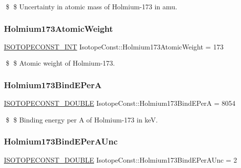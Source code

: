 \$ \$ Uncertainty in atomic mass of Holmium-\/173 in amu. \mbox{\label{group___isotope_const-_holmium-_ho173_ga787717fe8e2a869a5706501192868481}} 
\subsubsection{\texorpdfstring{Holmium173\+Atomic\+Weight}{Holmium173AtomicWeight}}
{\footnotesize\ttfamily \mbox{\hyperlink{group___isotope_const-_macros_ga5f18360b3e99483a35c32d789e62621c}{I\+S\+O\+T\+O\+P\+E\+C\+O\+N\+S\+T\+\_\+\+I\+NT}} Isotope\+Const\+::\+Holmium173\+Atomic\+Weight = 173}

\$ \$ Atomic weight of Holmium-\/173. \mbox{\label{group___isotope_const-_holmium-_ho173_gac6420527bf4813cfd605c01fb83e79b8}} 
\subsubsection{\texorpdfstring{Holmium173\+Bind\+E\+PerA}{Holmium173BindEPerA}}
{\footnotesize\ttfamily \mbox{\hyperlink{group___isotope_const-_macros_ga8f45a7272ce02c0b4c65c44636ed719a}{I\+S\+O\+T\+O\+P\+E\+C\+O\+N\+S\+T\+\_\+\+D\+O\+U\+B\+LE}} Isotope\+Const\+::\+Holmium173\+Bind\+E\+PerA = 8054}

\$ \$ Binding energy per A of Holmium-\/173 in keV. \mbox{\label{group___isotope_const-_holmium-_ho173_gaa86fe779584d4318f7cdbbf8e7700664}} 
\subsubsection{\texorpdfstring{Holmium173\+Bind\+E\+Per\+A\+Unc}{Holmium173BindEPerAUnc}}
{\footnotesize\ttfamily \mbox{\hyperlink{group___isotope_const-_macros_ga8f45a7272ce02c0b4c65c44636ed719a}{I\+S\+O\+T\+O\+P\+E\+C\+O\+N\+S\+T\+\_\+\+D\+O\+U\+B\+LE}} Isotope\+Const\+::\+Holmium173\+Bind\+E\+Per\+A\+Unc = 2}

